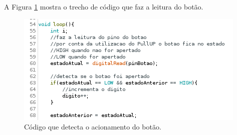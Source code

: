 \documentclass[12pt]{article}
\begin{document}
	A Figura \ref{figExp4botao} mostra o trecho de código que faz a leitura do botão.

	\begin{figure}[h!]
		\centering
		\includegraphics[scale=0.65]{Imagens/Experimentos/4-Display7Seg/codigoBotao.png}
		\caption{Código que detecta o acionamento do botão.}
		\label{figExp4botao}
	\end{figure}



\end{document}
